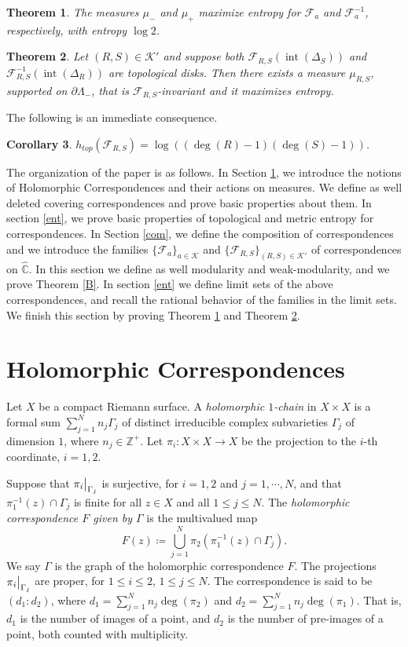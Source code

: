 \documentclass[11pt,letterpaper]{article}
\newtheorem{theorem}{Theorem}[section]
\newtheorem{corollary}[theorem]{Corollary}
\theoremstyle{definition}
\def\interior{\operatorname{int}}
\newcommand\restr[2]{{%
  \left.\kern-\nulldelimiterspace %
  #1 %
  \vphantom{\big|} %
  \right|_{#2} %
  }}
\def\F{\mathcal{F}_a}
\begin{document}
\begin{theorem}\label{A}
The measures $\mu_-$ and $\mu_+$ maximize entropy for $\F$ and $\F^{-1}$, respectively, with entropy $\log 2$.
\end{theorem}


\begin{theorem}\label{C}
Let $(R,S)\in\mathcal{K}'$ and suppose both $\mathcal{F}_{R,S}(\interior(\Delta_S))$ and $\mathcal{F}_{R,S}^{-1}(\interior(\Delta_{R}))$ are topological disks. Then there exists a measure $\mu_{R,S}$, supported on $\partial\Lambda_-$, that is $\mathcal{F}_{R,S}$-invariant and it maximizes entropy.
\end{theorem}
The following is an immediate consequence.
\begin{corollary} $h_{top}(\mathcal{F}_{R,S})=\log((\deg(R)-1)(\deg(S)-1))$.
\end{corollary}


The organization of the paper is as follows. In Section \ref{hol}, we introduce the notions of Holomorphic Correspondences and their actions on measures. We define as well deleted covering correspondences and prove basic properties about them. In section \ref{ent}, we prove basic properties of topological and metric entropy for correspondences. In Section \ref{com}, we define the composition of correspondences and we introduce the families  $\lbrace\F\rbrace_{a\in\mathcal{K}}$ and $\lbrace\mathcal{F}_{R,S}\rbrace_{(R,S)\in\mathcal{K}'}$ of correspondences on $\widehat{\mathbb{C}}$. In this section we define as well modularity and weak-modularity, and we prove Theorem \ref{B}. In section \ref{ent} we define limit sets of the above correspondences, and recall the rational behavior of the families in the limit sets. We finish this section by proving Theorem \ref{A} and Theorem \ref{C}. 


\section{Holomorphic Correspondences}\label{hol}
Let $X$ be a compact Riemann surface. A \emph{holomorphic $1$-chain} in $X\times X$ is a formal sum $\sum_{j=1}^N n_j\Gamma_j$ of distinct irreducible complex subvarieties $\Gamma_j$ of dimension $1$, where $n_j\in\mathbb{Z}^+$. Let $\pi_i:X\times X\to X$ be the projection to the $i$-th coordinate, $i=1,2$. %

Suppose that $\restr{\pi_i}{\Gamma_j}$ is surjective, for $i=1,2$ and $j=1,\cdots, N$, and that $\pi_1^{-1}(z)\cap \Gamma_j$ is finite for all $z\in X$ and all $1\leq j\leq N$. The \emph{holomorphic correspondence $F$ given by $\Gamma$} is the multivalued map
$$F(z)\coloneqq\bigcup\limits_{j=1}^N\pi_2\left(\pi_1^{-1}(z)\cap\Gamma_j\right).$$
We say $\Gamma$ is the graph of the holomorphic correspondence $F$. The projections $\restr{\pi_i}{\Gamma_j}$ are proper, for $1\leq i\leq 2$, $1\leq j\leq N$. The correspondence is said to be $(d_1:d_2)$, where $d_1=\sum\limits_{j=1}^Nn_j\deg(\pi_2)$ and $d_2=\sum\limits_{j=1}^Nn_j\deg(\pi_1)$. That is, $d_1$ is the number of images of a point, and $d_2$ is the number of pre-images of a point, both counted with multiplicity. 
\end{document}
